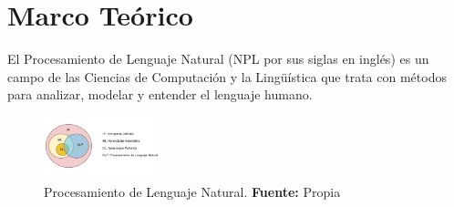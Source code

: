 \section{Marco Teórico} %
El Procesamiento de Lenguaje Natural (NPL por sus siglas en inglés) es un campo de las Ciencias de Computación y la Lingüística que trata con métodos para analizar, modelar y entender el lenguaje humano.\\
\begin{figure}[H]
\begin{centering}
\includegraphics[angle=0,width=0.3\textwidth]{Figuras/NLP.png}
\par \end{centering}
\caption[Procesamiento de Lenguaje Natural]{Procesamiento de Lenguaje Natural. \textbf{Fuente:} Propia}
\label{NLP}
\end{figure}

